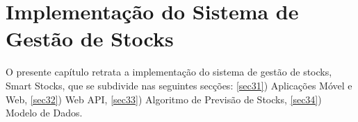 %
%
\chapter{Implementação do Sistema de Gestão de Stocks} \label{cap3}

O presente capítulo retrata a implementação do sistema de gestão de stocks, Smart Stocks, que se subdivide nas seguintes secções: \ref{sec31}) Aplicações Móvel e Web, \ref{sec32}) Web API, \ref{sec33}) Algoritmo de Previsão de Stocks, \ref{sec34}) Modelo de Dados.




